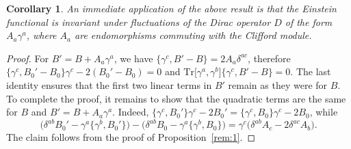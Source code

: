 \documentclass[10pt,a4paper]{amsart}
\numberwithin{equation}{section}
\newtheorem{Corollary}[Theorem]{Corollary}
\theoremstyle{definition}
\def\Tr{\mathrm{Tr}}
\begin{document}
\begin{Corollary} \label{example:fl}
	An immediate application of the above result is that the Einstein functional is invariant under fluctuations of the Dirac operator $D$ of the form $A_a \gamma^a$, where $A_a$ are endomorphisms commuting with the Clifford module.
\end{Corollary}
\begin{proof}
	For $B'=B+A_a\gamma^a$, we have $\{\gamma^c, B'-B\}=2A_a\delta^{ac}$, therefore $\{\gamma^c, B_0'-B_0\}\gamma^c - 2(B_0'-B_0)=0$ and $\Tr\bigl[\gamma^a,\gamma^b\bigr]\{\gamma^c, B'-B \}=0$. The last identity ensures that the first two linear terms in $B'$ remain as they were for $B$. To complete the proof, it remains to show that the quadratic terms are the same for $B$ and $B'=B+A_a\gamma^a$. Indeed, $\{\gamma^c, B_0'\}\gamma^c -2B_0'=\{\gamma^c, B_0\}\gamma^c - 2B_0$, while
	\[
	\bigl(\delta^{ab}B_0'-\gamma^a\bigl\{\gamma^b,B_0'\bigr\}\bigr)-\bigl(\delta^{ab}B_0 -\gamma^a \bigl\{\gamma^b, B_0\bigr\}\bigr)=\gamma^c \bigl(\delta^{ab} A_c -2\delta^{ac} A_b\bigr).
	\]
	The claim follows from the proof of Proposition~\ref{rem:1}.
\end{proof}
\end{document}
